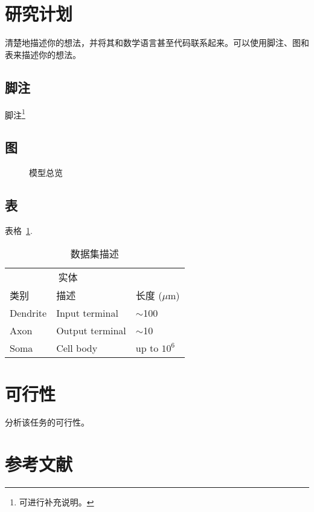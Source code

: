 \documentclass{article}
\begin{document}
\section{研究计划}


清楚地描述你的想法，并将其和数学语言甚至代码联系起来。可以使用脚注、图和表来描述你的想法。


\subsection{脚注}

脚注\footnote{可进行补充说明。}


\subsection{图}

\begin{figure}[h]
  \centering
  \fbox{\rule[-.5cm]{0cm}{4cm} \rule[-.5cm]{4cm}{0cm}}
  \caption{模型总览}
\end{figure}

\subsection{表}

表格~\ref{sample-table}.

\begin{table}[t]
  \caption{数据集描述}
  \label{sample-table}
  \centering
  \begin{tabular}{lll}
    \toprule
    \multicolumn{2}{c}{实体}                   \\
    \cmidrule{1-2}
    类别     & 描述     & 长度 ($\mu$m) \\
    \midrule
    Dendrite & Input terminal  & $\sim$100     \\
    Axon     & Output terminal & $\sim$10      \\
    Soma     & Cell body       & up to $10^6$  \\
    \bottomrule
  \end{tabular}
\end{table}

\section{可行性}

分析该任务的可行性。


\section*{参考文献}
\end{document}
